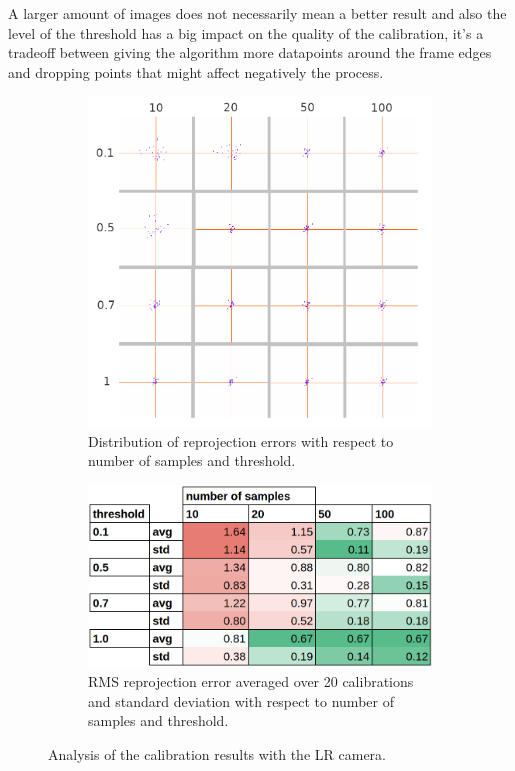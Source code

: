 A larger amount of images does not necessarily mean a better result and also the level of the threshold has a big impact on the quality of the calibration, it's a tradeoff between giving the algorithm more datapoints around the frame edges and dropping points that might affect negatively the process.

\begin{figure}[H]
  \centering
  \begin{subfigure}{.5\textwidth}
    \centering
    \includegraphics[width=.8\linewidth]{figures/reprj_dist_LR.png}
    \caption{Distribution of reprojection errors with
    \newline respect to number of samples and threshold.}
    \label{fig:reprj_dist_LR}
  \end{subfigure}%
  \begin{subfigure}{.5\textwidth}
    \centering
    \includegraphics[width=0.8\linewidth]{figures/calib_results_table_LR.png}
    \caption{RMS reprojection error averaged over 20 calibrations and standard deviation with respect to number of samples and threshold.}
    \label{fig:calib_stats_LR}
  \end{subfigure}
  \caption{Analysis of the calibration results with the LR camera.}
  \label{fig:calib_analysis_LR}
\end{figure}

